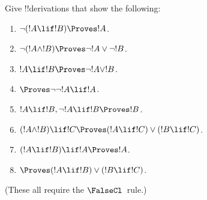 \begin{prob}
Give !!{derivation}s that show the following:
\begin{enumerate}
\item $\lnot(!A \lif !B) \Proves !A$.
\item $\lnot(!A \land !B) \Proves \lnot !A \lor \lnot !B$.
\item $!A \lif !B \Proves \lnot !A \lor !B$.
\item $\Proves \lnot \lnot !A \lif !A$.
\item $!A \lif !B, \lnot !A \lif !B \Proves !B$.
\item $(!A \land !B) \lif !C \Proves (!A \lif !C) \lor (!B \lif !C)$.
\item $(!A \lif !B) \lif !A \Proves !A$.
\item $\Proves (!A \lif !B) \lor (!B \lif !C)$.
\end{enumerate}
(These all require the $\FalseCl$~rule.)
\end{prob}




  



